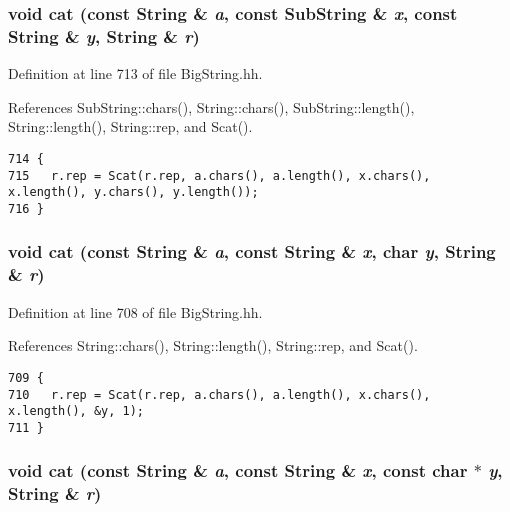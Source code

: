\subsubsection{\setlength{\rightskip}{0pt plus 5cm}void cat (const {\bf String} \& {\em a}, const {\bf Sub\-String} \& {\em x}, const {\bf String} \& {\em y}, {\bf String} \& {\em r})\hspace{0.3cm}{\tt  [inline]}}\label{BigString_8hh_a50}




Definition at line 713 of file Big\-String.hh.

References Sub\-String::chars(), String::chars(), Sub\-String::length(), String::length(), String::rep, and Scat().



\footnotesize\begin{verbatim}714 {
715   r.rep = Scat(r.rep, a.chars(), a.length(), x.chars(), x.length(), y.chars(), y.length());
716 }
\end{verbatim}\normalsize 
{}
\subsubsection{\setlength{\rightskip}{0pt plus 5cm}void cat (const {\bf String} \& {\em a}, const {\bf String} \& {\em x}, char {\em y}, {\bf String} \& {\em r})\hspace{0.3cm}{\tt  [inline]}}\label{BigString_8hh_a49}




Definition at line 708 of file Big\-String.hh.

References String::chars(), String::length(), String::rep, and Scat().



\footnotesize\begin{verbatim}709 {
710   r.rep = Scat(r.rep, a.chars(), a.length(), x.chars(), x.length(), &y, 1);
711 }
\end{verbatim}\normalsize 
{}
\subsubsection{\setlength{\rightskip}{0pt plus 5cm}void cat (const {\bf String} \& {\em a}, const {\bf String} \& {\em x}, const char $\ast$ {\em y}, {\bf String} \& {\em r})\hspace{0.3cm}{\tt  [inline]}}\label{BigString_8hh_a48}




